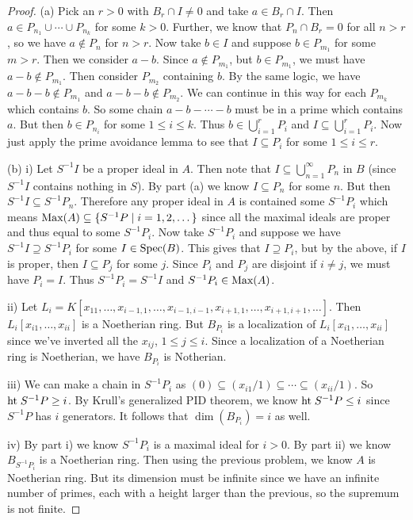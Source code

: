 \documentclass{article}
\newcommand{\spec}{\textup{Spec}}
\newcommand{\Ht}{\textup{ht}\;}
\newcommand{\Max}{\textup{Max}}
\begin{document}
\begin{proof}
(a) Pick an $r > 0$ with $B_r \cap I \neq 0$ and take $a \in B_r \cap I$. Then $a \in P_{n_1} \cup \cdots \cup P_{n_k}$ for some $k > 0$. Further, we know that $P_n \cap B_r = 0$ for all $n > r$, so we have $a \notin P_n$ for $n > r$. Now take $b \in I$ and suppose $b \in P_{m_1}$ for some $m > r$. Then we consider $a - b$. Since $a \notin P_{m_1}$, but $b \in P_{m_1}$, we must have $a-b \notin P_{m_1}$. Then consider $P_{m_2}$ containing $b$. By the same logic, we have $a-b-b \notin P_{m_1}$ and $a-b-b \notin P_{m_2}$. We can continue in this way for each $P_{m_k}$ which contains $b$. So some chain $a - b - \cdots - b$ must be in a prime which contains $a$. But then $b \in P_{n_i}$ for some $1 \leq i \leq k$. Thus $b \in \bigcup_{i=1}^r P_i$ and $I \subseteq \bigcup_{i=1}^r P_i$. Now just apply the prime avoidance lemma to see that $I \subseteq P_i$ for some $1 \leq i \leq r$.

(b) i) Let $S^{-1}I$ be a proper ideal in $A$. Then note that $I \subseteq \bigcup_{n=1}^{\infty} P_n$ in $B$ (since $S^{-1}I$ contains nothing in $S$). By part (a) we know $I \subseteq P_n$ for some $n$. But then $S^{-1}I \subseteq S^{-1}P_n$. Therefore any proper ideal in $A$ is contained some $S^{-1}P_i$ which means $\Max(A) \subseteq \{S^{-1}P \mid i = 1, 2, \dots \}$ since all the maximal ideals are proper and thus equal to some $S^{-1}P_i$. Now take $S^{-1}P_i$ and suppose we have $S^{-1}I \supseteq S^{-1}P_i$ for some $I \in \spec(B)$. This gives that $I \supseteq P_i$, but by the above, if $I$ is proper, then $I \subseteq P_j$ for some $j$. Since $P_i$ and $P_j$ are disjoint if $i \neq j$, we must have $P_i = I$. Thus $S^{-1}P_i = S^{-1}I$ and $S^{-1}P_i \in \Max(A)$.

ii) Let $L_i = K[x_{11}, \dots , x_{i-1,1}, \dots , x_{i-1,i-1}, x_{i+1,1}, \dots , x_{i+1, i+1}, \dots ]$. Then $L_i[x_{i1}, \dots , x_{ii}]$ is a Noetherian ring. But $B_{P_i}$ is a localization of $L_i[x_{i1}, \dots , x_{ii}]$ since we've inverted all the $x_{ij}$, $1 \leq j \leq i$. Since a localization of a Noetherian ring is Noetherian, we have $B_{P_i}$ is Notherian.

iii) We can make a chain in $S^{-1}P_i$ as $(0) \subseteq (x_{i1}/1) \subseteq \cdots \subseteq (x_{ii}/1)$. So $\Ht S^{-1}P \geq i$. By Krull's generalized PID theorem, we know $\Ht S^{-1}P \leq i$ since $S^{-1}P$ has $i$ generators. It follows that $\dim(B_{P_i}) = i$ as well.

iv) By part i) we know $S^{-1}P_i$ is a maximal ideal for $i > 0$. By part ii) we know $B_{S^{-1}P_i}$ is a Noetherian ring. Then using the previous problem, we know $A$ is Noetherian ring. But its dimension must be infinite since we have an infinite number of primes, each with a height larger than the previous, so the supremum is not finite.
\end{proof}
\end{document}
